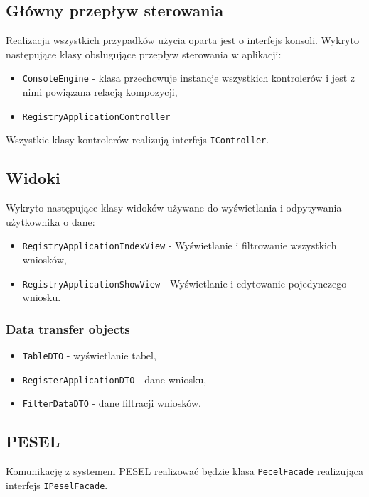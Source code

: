 \documentclass[12pt]{article}
\begin{document}
\subsection{Główny przepływ sterowania}
Realizacja wszystkich przypadków użycia oparta jest o interfejs konsoli. 
Wykryto następujące klasy obsługujące przepływ sterowania w aplikacji:
\begin{itemize}[noitemsep]
    \item \lstinline{ConsoleEngine} - klasa przechowuje instancje wszystkich kontrolerów i jest z nimi powiązana relacją kompozycji,
    \item \lstinline{RegistryApplicationController}
\end{itemize}
Wszystkie klasy kontrolerów realizują interfejs \lstinline{IController}.

\subsection{Widoki}
Wykryto następujące klasy widoków używane do wyświetlania i odpytywania użytkownika o dane:
\begin{itemize}[noitemsep]
    \item \lstinline{RegistryApplicationIndexView} - Wyświetlanie i filtrowanie wszystkich wniosków,
    \item \lstinline{RegistryApplicationShowView} - Wyświetlanie i edytowanie pojedynczego wniosku.
\end{itemize}
\subsubsection{Data transfer objects}

\begin{itemize}[noitemsep]
    \item \lstinline{TableDTO} - wyświetlanie tabel,
    \item \lstinline{RegisterApplicationDTO} - dane wniosku,
    \item \lstinline{FilterDataDTO} - dane filtracji wniosków.
\end{itemize}

\subsection{PESEL}
Komunikację z systemem PESEL realizować będzie klasa \lstinline{PecelFacade} realizująca interfejs \lstinline{IPeselFacade}.

\newpage
\end{document}
